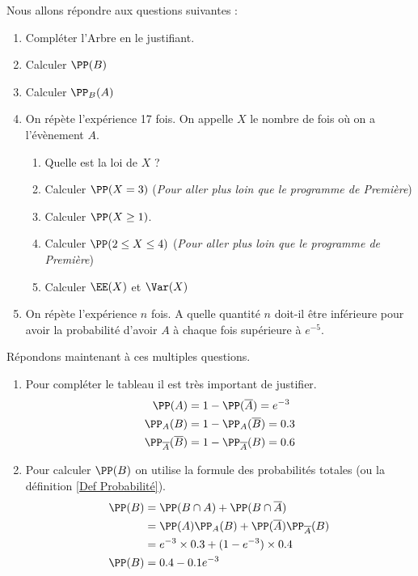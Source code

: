 \documentclass[12pt,fleqn]{report} %
\begin{document}
\begin{example}
	Nous allons répondre aux questions suivantes :
	\begin{enumerate}
		\item Compléter l'Arbre en le justifiant.
		\item Calculer $\PP(B)$
		\item Calculer $\PP_B(A)$
		\item On répète l'expérience 17 fois. On appelle $X$ le nombre de fois où on a l'évènement $A$.
		\begin{enumerate}
			\item Quelle est la loi de $X$ ? 
			\item Calculer $\PP(X = 3)$ (\textit{Pour aller plus loin que le programme de Première})
			\item Calculer $\PP(X \geq 1)$. 
			\item Calculer $\PP(2 \leq X \leq 4)$ (\textit{Pour aller plus loin que le programme de Première})
			\item Calculer $\EE(X)$ et $\Var(X)$
		\end{enumerate}
		\item On répète l'expérience $n$ fois. A quelle quantité $n$ doit-il être inférieure pour avoir la probabilité d'avoir $A$ à chaque fois supérieure à $e^{-5}$.
	\end{enumerate}
	\vspace{10pt}
	Répondons maintenant à ces multiples questions.
	\begin{enumerate}
		\item Pour compléter le tableau il est très important de justifier.
		\begin{align*}
		\PP({A}) & = 1 - \PP(\overline{A}) = e^{-3} \\
		\PP_A(B) & = 1 - \PP_A(\overline{B}) = 0.3 \\
		\PP_{\overline{A}}(\overline{B}) & = 1 - \PP_{\overline{A}}(B) = 0.6
		\end{align*}
		\item Pour calculer $\PP(B)$ on utilise la formule des probabilités totales (ou la définition \ref{Def Probabilité}).
		\begin{align*}
		\PP(B) & = \PP(B \cap A) + \PP(B \cap \overline{A}) \\ 
		& = \PP(A) \PP_A(B) + \PP(\overline{A}) \PP_{\overline{A}}(B) \\ 
		& = e^{-3} \times 0.3 + (1 - e^{-3})\times 0.4 \\
		\PP(B) & = 0.4 -0.1 e^{-3} 
		\end{align*}

\end{enumerate}
\end{example}
\end{document}

